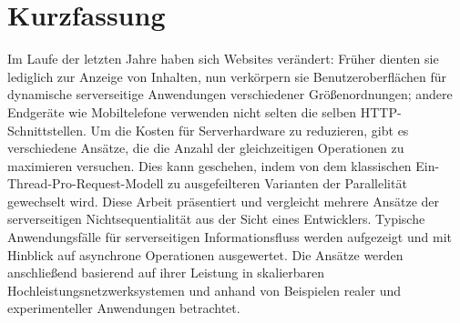 \chapter{Kurzfassung}
Im Laufe der letzten Jahre haben sich Websites ver{\"a}ndert: Fr{\"u}her dienten sie lediglich zur Anzeige von Inhalten, nun verk{\"o}rpern sie Benutzeroberfl{\"a}chen f{\"u}r dynamische serverseitige Anwendungen verschiedener Gr{\"o}{\ss}enordnungen; andere Endger{\"a}te wie Mobiltelefone verwenden nicht selten die selben HTTP-Schnittstellen. Um die Kosten f{\"u}r Serverhardware zu reduzieren, gibt es verschiedene Ans{\"a}tze, die die Anzahl der gleichzeitigen Operationen zu maximieren versuchen. Dies kann geschehen, indem von dem klassischen Ein-Thread-Pro-Request-Modell zu ausgefeilteren Varianten der Parallelit{\"a}t gewechselt wird. Diese Arbeit pr{\"a}sentiert und vergleicht mehrere Ans{\"a}tze der serverseitigen Nichtsequentialit{\"a}t aus der Sicht eines Entwicklers. Typische Anwendungsf{\"a}lle f{\"u}r serverseitigen Informationsfluss werden aufgezeigt und mit Hinblick auf asynchrone Operationen ausgewertet. Die Ans{\"a}tze werden anschlie{\ss}end basierend auf ihrer Leistung in skalierbaren Hochleistungsnetzwerksystemen und anhand von Beispielen realer und experimenteller Anwendungen betrachtet.